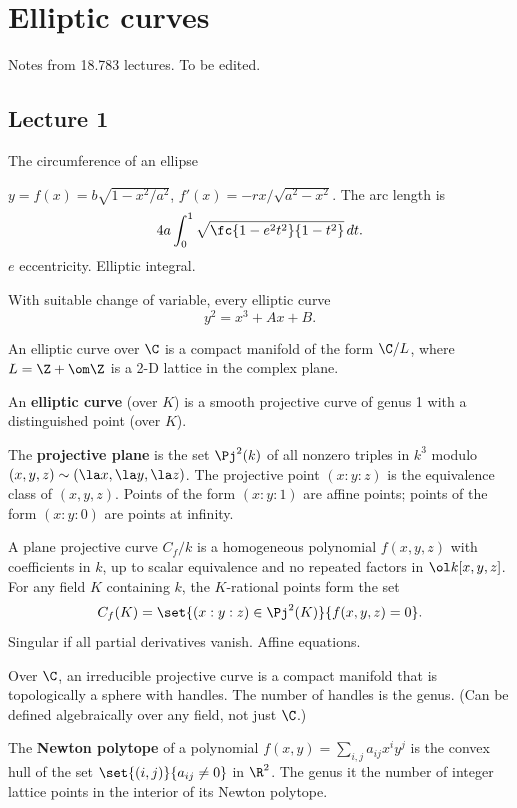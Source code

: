 \chapter{Elliptic curves}
Notes from 18.783 lectures. To be edited.
\section{Lecture 1}
The circumference of an ellipse

$y=f(x)=b\sqrt{1-x^2/a^2}$, $f'(x)=-rx/\sqrt{a^2-x^2}$. The arc length is
\[
4a \int_0^1 \sqrt{\fc{1-e^2t^2}{1-t^2}}\,dt.
\]
$e$ eccentricity.
Elliptic integral.

With suitable change of variable, every elliptic curve
\[
y^2=x^3+Ax+B.
\]


An elliptic curve over $\C$ is a compact manifold of the form $\C/L$, where $L=\Z+\om \Z$ is a 2-D lattice in the complex plane.

\begin{df}
An \textbf{elliptic curve} (over $K$) is a smooth projective curve of genus 1 with a distinguished point (over $K$).
\end{df}
\begin{df}
The \textbf{projective plane} is the set $\Pj^2(k)$ of all nonzero triples in $k^3$ modulo $(x,y,z)\sim (\la x,\la y,\la z)$. 
The projective point $(x:y:z)$ is the equivalence class of $(x,y,z)$. Points of the form $(x:y:1)$ are affine points; points of the form $(x:y:0)$ are points at infinity.

A plane projective curve $C_f/k$ is a homogeneous polynomial $f(x,y,z)$ with coefficients in $k$, up to scalar equivalence and no repeated factors in $\ol k[x,y,z]$. For any field $K$ containing $k$, the $K$-rational points form the set
\[
C_f(K)=\set{(x:y:z)\in \Pj^2(K)}{f(x,y,z)=0}.
\]
Singular if all partial derivatives vanish.
Affine equations.
\end{df}
Over $\C$, an irreducible projective curve is a compact manifold that is topologically a sphere with handles. The number of handles is the genus. (Can be defined algebraically over any field, not just $\C$.)

The \textbf{Newton polytope} of a polynomial $f(x,y)=\sum_{i,j} a_{ij} x^iy^j$ is the convex hull of the set $\set{(i,j)}{a_{ij}\ne 0}$ in $\R^2$. The genus it the number of integer lattice points in the interior of its Newton polytope.

